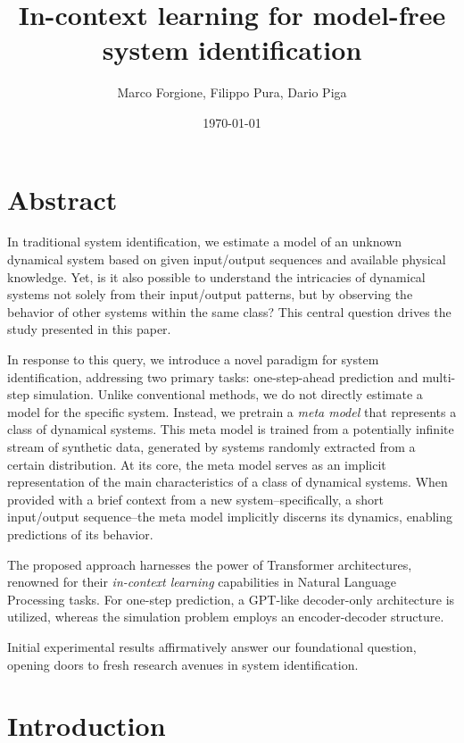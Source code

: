 \documentclass{article}
\title{In-context learning for model-free system identification}
\author{Marco Forgione, Filippo Pura, Dario Piga}
\affil{IDSIA Dalle Molle Institute for Artificial Intelligence USI-SUPSI, Via la Santa 1, CH-6962 Lugano-Viganello, Switzerland.}
\date{\today}
\begin{document}
\maketitle


\section*{Abstract}

In traditional system identification, we estimate a model of an unknown dynamical system based on given input/output sequences and available physical knowledge. Yet, is it also possible to understand the intricacies of dynamical systems not solely from their input/output patterns, but   by observing the behavior of other systems within the same class? This central question drives the study presented in this paper.

In response to this query, we introduce a novel paradigm for system identification, addressing two primary tasks: one-step-ahead prediction and multi-step simulation. Unlike conventional methods, we do not directly estimate a model for the specific system. Instead, we pretrain a \emph{meta model} that represents a class of dynamical systems. This meta model is trained from a potentially infinite stream of synthetic data, generated by systems randomly extracted from a certain distribution. At its core, the meta model serves as an implicit representation of the main characteristics of a class of dynamical systems. When provided with a brief context from a new system--specifically, a short input/output sequence--the meta model implicitly discerns its dynamics, enabling predictions of its behavior.

The proposed approach harnesses the power of Transformer architectures, renowned for their \emph{in-context learning} capabilities in Natural Language Processing tasks.  For one-step prediction, a GPT-like decoder-only architecture is utilized, whereas the  simulation problem employs an encoder-decoder structure.

Initial experimental results affirmatively answer our foundational question, opening doors to fresh research avenues in system identification.


\section{Introduction}
\end{document}
